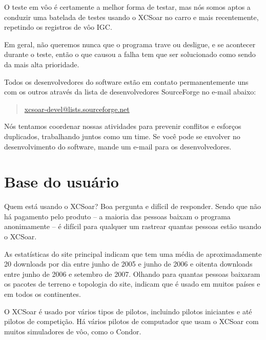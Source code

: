 O teste em vôo é certamente a melhor forma de testar, mas nós somos aptos a conduzir uma batelada de testes usando o XCSoar no carro e mais recentemente, repetindo os registros de vôo IGC.

Em geral, não queremos nunca que o programa trave ou desligue, e se acontecer durante o teste, então o que causou a falha tem que ser solucionado como sendo da mais alta prioridade.

Todos os desenvolvedores do software estão em contato permanentemente uns com os outros através da lista de desenvolvedores SourceForge no e-mail abaixo:

\begin{quote}
\url{xcsoar-devel@lists.sourceforge.net}
\end{quote}
Nós tentamos coordenar nossas atividades para prevenir conflitos e esforços duplicados, trabalhando juntos como um time.  Se você pode se envolver no desenvolvimento do software, mande um e-mail para os desenvolvedores.


\section{Base do usuário}

Quem está usando o XCSoar?  Boa pergunta e difícil de responder.  Sendo que não há pagamento pelo produto – a maioria das pessoas baixam o programa anonimamente – é difícil para qualquer um rastrear quantas pessoas estão usando o XCSoar.  

As estatísticas do site principal indicam que tem uma média de aproximadamente 20 downloads por dia entre junho de 2005 e junho de 2006 e oitenta downloads entre junho de 2006 e setembro de 2007.  Olhando para quantas pessoas baixaram os pacotes de terreno e topologia do site, indicam que é usado em muitos países e em todos os continentes.

O XCSoar é usado por vários tipos de pilotos, incluindo pilotos iniciantes e até pilotos de competição.  Há vários pilotos de computador que usam o XCSoar com muitos simuladores de vôo, como o Condor.


